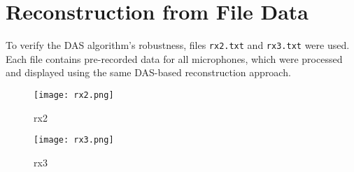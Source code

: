 \documentclass{article}
\begin{document}
\FloatBarrier

\section{Reconstruction from File Data}
To verify the DAS algorithm's robustness, files \texttt{rx2.txt} and \texttt{rx3.txt} were used. Each file contains pre-recorded data for all microphones, which were processed and displayed using the same DAS-based reconstruction approach.

\begin{figure}[!h]
	\centering
	\texttt{[image: rx2.png]}
	\caption{rx2}
\end{figure}

\begin{figure}[!h]
	\centering
	\texttt{[image: rx3.png]}
	\caption{rx3}
\end{figure}
\end{document}
